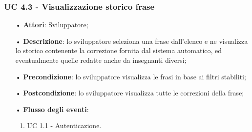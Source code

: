 \subsubsection{UC 4.3 - Visualizzazione storico frase}
\begin{itemize}
\item[•]\textbf{Attori}: Sviluppatore;
\item[•]\textbf{Descrizione}: lo sviluppatore seleziona una frase dall'elenco e ne visualizza lo storico contenente la correzione fornita dal sistema automatico, ed eventualmente quelle redatte anche da insegnanti diversi;
\item[•]\textbf{Precondizione}: lo sviluppatore visualizza le frasi in base ai filtri stabiliti;
\item[•]\textbf{Postcondizione}: lo sviluppatore visualizza tutte le correzioni della frase;
\item[•]\textbf{Flusso degli eventi}: 
	\begin{enumerate}
	\item UC 1.1 - Autenticazione.
\end{enumerate}
\end{itemize}

